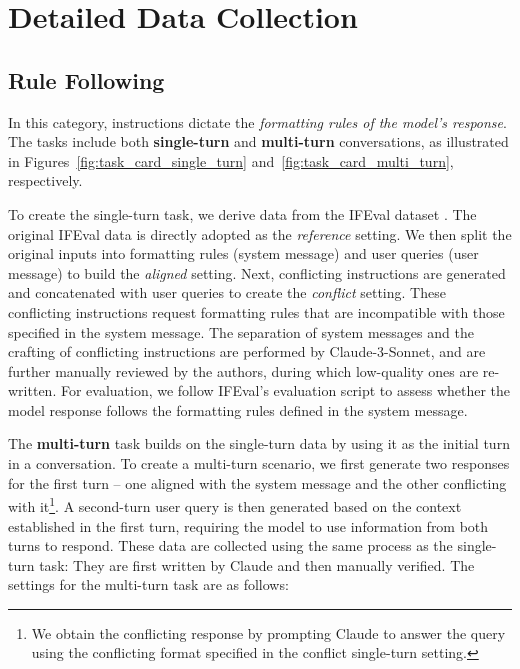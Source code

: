 \section{Detailed Data Collection}
\label{app:tasks}

\subsection{Rule Following}
\label{sec:rule_following}

In this category, instructions dictate the \textit{formatting rules of the model's response}. The tasks include both \textbf{single-turn} and \textbf{multi-turn} conversations, as illustrated in Figures~\ref{fig:task_card_single_turn} and~\ref{fig:task_card_multi_turn}, respectively.

To create the single-turn task, we derive data from the IFEval dataset \citep{ifeval}. The original IFEval data is directly adopted as the \textit{reference} setting. We then split the original inputs into formatting rules (system message) and user queries (user message) to build the \textit{aligned} setting. Next, conflicting instructions are generated and concatenated with user queries to create the \textit{conflict} setting. These conflicting instructions request formatting rules that are incompatible with those specified in the system message. The separation of system messages and the crafting of conflicting instructions are performed by Claude-3-Sonnet, and are further manually reviewed by the authors, during which low-quality ones are re-written. For evaluation, we follow IFEval's evaluation script to assess whether the model response follows the formatting rules defined in the system message.


The \textbf{multi-turn} task builds on the single-turn data by using it as the initial turn in a conversation. To create a multi-turn scenario, we first generate two responses for the first turn -- one aligned with the system message and the other conflicting with it\footnote{We obtain the conflicting response by prompting Claude to answer the query using the conflicting format specified in the conflict single-turn setting.}. A second-turn user query is then generated based on the context established in the first turn, requiring the model to use information from both turns to respond. These data are collected using the same process as the single-turn task: They are first written by Claude and then manually verified. The settings for the multi-turn task are as follows:

